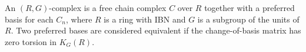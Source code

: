 An $(R, G)$-complex is a free chain complex $C$ over $R$ together with a preferred basis for each $C_n$, where $R$ is a ring with IBN and $G$ is a subgroup of the units of $R$. Two preferred bases are considered equivalent if the change-of-basis matrix has zero torsion in $K_G(R)$.
